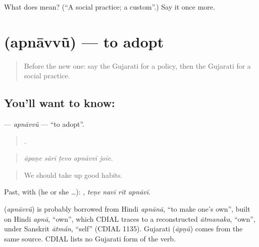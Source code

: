 \begin{tcolorbox}[breakable,colback=teal!4,colframe=teal!35!black,title={Before you move on}]
What does  mean? (\textquotedblleft{}A social practice; a custom\textquotedblright{}.) Say it once more.
\end{tcolorbox}
\section[\texorpdfstring{\gu{અપનાવવું} (apnāvvũ)}{અપનાવવું (apnāvvũ)}]{ (apnāvvũ) — to adopt}

\label{lesson:GU-C357-apnavvu}



\begin{quote}
Before the new one: say the Gujarati for a policy, then the Gujarati for a social practice.
\end{quote}

\subsection*{You'll want to know: }
\textbf{} — \emph{apnāvvũ} — \textquotedblleft{}to adopt\textquotedblright{}.

\begin{quote}
    .
\end{quote}

\begin{quote}
\emph{āpaṇe sārī ṭevo apnāvvī joīe.}
\end{quote}

\begin{quote}
We should take up good habits.
\end{quote}

Past, with  (he or she …):    , \emph{teṇe navī rīt apnāvī}.

\begin{cousinweb}
\textbf{} (\emph{apnāvvũ}) is probably borrowed from Hindi \emph{apnānā}, \textquotedblleft{}to make one's own\textquotedblright{}, built on Hindi \emph{apnā}, \textquotedblleft{}own\textquotedblright{}, which CDIAL traces to a reconstructed \emph{ātmanaka}, \textquotedblleft{}own\textquotedblright{}, under Sanskrit \emph{ātmán}, \textquotedblleft{}self\textquotedblright{} (CDIAL 1135). Gujarati \textbf{} (\emph{āpṇũ}) comes from the same source. CDIAL lists no Gujarati form of the verb.
\end{cousinweb}

